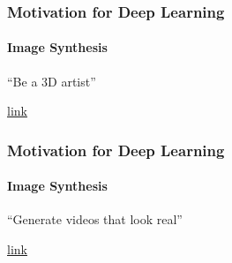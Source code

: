 \documentclass[xetex,professionalfont]{beamer}
\begin{document}
\begin{frame}
\frametitle{Motivation for Deep Learning}
\framesubtitle{Image Synthesis}

\begin{center}
\enquote{Be a 3D artist}
\end{center}

\smallskip

\begin{center}
    {\centering\href{https://dreamfusion3d.github.io}{link}}
\end{center}
    
\end{frame}


\begin{frame}
\frametitle{Motivation for Deep Learning}
\framesubtitle{Image Synthesis}

\begin{center}
\enquote{Generate videos that look real}
\end{center}

\smallskip

\begin{center}
    {\centering\href{https://www.youtube.com/watch?v=GrP_aOSXt5U}{link}} %
\end{center}

\end{frame}
\end{document}
